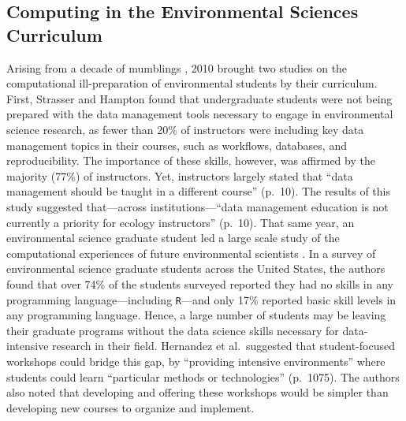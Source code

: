 \documentclass[12pt]{article}
\begin{document}
\subsection{Computing in the Environmental Sciences Curriculum}

\quad Arising from a decade of mumblings \citep{andelman, dodds1, dodds2, eglen, 
green, hastings, kelling, wilson-software-carpentry, wilson, wing}, 2010 brought
two studies on the computational ill-preparation of environmental students by
their curriculum. First, Strasser and Hampton found that undergraduate students
were not being prepared with the data management tools necessary to engage in
environmental science research, as fewer than 20\% of instructors were including
key data management topics in their courses, such as workflows, databases,
and reproducibility. The importance of these skills, however, was affirmed by
the majority (77\%) of instructors. Yet, instructors largely stated that ``data
management should be taught in a different course'' (p.\ 10). The results of 
this study suggested that---across institutions---``data management education
is not currently a priority for ecology instructors'' (p.\ 10). That same year,
an environmental science graduate student led a large scale study of the
computational experiences of future environmental scientists 
\citep[p.\ 1068]{hernandez}. In a survey of environmental science graduate 
students across the United States, the authors found that over 74\% of the
students surveyed reported they had no skills in any programming 
language---including \texttt{R}---and only 17\% reported basic skill levels in
any programming language. Hence, a large number of students may be leaving their
graduate programs without the data science skills necessary for data-intensive
research in their field. Hernandez et al.\ suggested that student-focused
workshops could bridge this gap, by ``providing intensive environments'' where
students could learn ``particular methods or technologies'' (p.\ 1075). The
authors also noted that developing and offering these workshops would be simpler
than developing new courses to organize and implement. 
\end{document}
